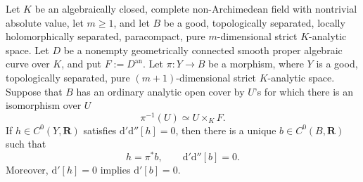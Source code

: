 \begin{proposition}
\label{prop:p062-proper-smooth-curve-bundle-descent}
Let \(K\) be an algebraically closed, complete non-Archimedean field with
nontrivial absolute value, let \(m\geq1\), and let \(B\) be a good,
topologically separated, locally holomorphically separated, paracompact,
pure \(m\)-dimensional strict \(K\)-analytic space.  Let \(D\) be a nonempty
geometrically connected smooth proper algebraic curve over \(K\), and put
\(F:=D^{\mathrm{an}}\).  Let \(\pi:Y\to B\) be a morphism, where \(Y\) is
a good, topologically separated, pure \((m+1)\)-dimensional strict
\(K\)-analytic space.  Suppose that \(B\) has an ordinary analytic open cover by
\(U\)'s for which there is an isomorphism over \(U\)
\[
                         \pi^{-1}(U)\simeq U\times_KF.
\]
If \(h\in C^0(Y,\mathbf R)\) satisfies
\(\mathrm d'\mathrm d''[h]=0\), then there is a unique
\(b\in C^0(B,\mathbf R)\) such that
\[
                         h=\pi^*b,
                         \qquad
                         \mathrm d'\mathrm d''[b]=0.
\]
Moreover, \(\mathrm d'[h]=0\) implies \(\mathrm d'[b]=0\).
\end{proposition}
